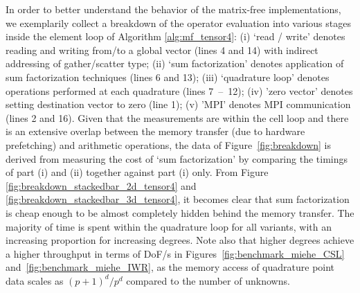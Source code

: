 \documentclass[AMA,STIX1COL]{WileyNJD-v2}
\begin{document}
In order to better understand the behavior of the matrix-free implementations,
we exemplarily collect a breakdown of the operator evaluation into various stages inside the element loop of Algorithm \ref{alg:mf_tensor4}:
(i) `read / write' denotes reading and writing from/to a global vector (lines 4 and 14) with indirect addressing of gather/scatter type;
(ii) `sum factorization' denotes application of sum factorization techniques (lines 6 and 13);
(iii) `quadrature loop' denotes operations performed at each quadrature (lines \mbox{7 -- 12});
(iv) 'zero vector' denotes setting destination vector to zero (line 1);
(v) 'MPI' denotes MPI communication (lines 2 and 16).
Given that the measurements are within the cell loop and there is an extensive overlap between the memory transfer (due to hardware prefetching) and arithmetic operations,
the data of Figure~\ref{fig:breakdown} is derived from measuring the cost of `sum factorization' by comparing the timings of
part (i) and (ii) together against part (i) only.
From Figure \ref{fig:breakdown_stackedbar_2d_tensor4} and  \ref{fig:breakdown_stackedbar_3d_tensor4}, it becomes clear that sum factorization is cheap enough
to be almost completely hidden behind the memory transfer.
The majority of time is spent within the quadrature loop for all variants, with an increasing proportion for increasing degrees.
Note also that higher degrees achieve a higher throughput in terms of DoF/s in Figures~\ref{fig:benchmark_miehe_CSL} and~\ref{fig:benchmark_miehe_IWR},
as the memory access of quadrature point data scales as $(p+1)^d/p^d$ compared to the number of unknowns.

\begin{table}
  \caption{Wall-clock time in seconds and performance in GFlops of Algorithms \ref{alg:mf_tensor2} and \ref{alg:mf_tensor4} in 2D for various combinations of polynomial degrees,
  vectorization and parallelization on Cascade Lake.}
  \label{tab:numbers_2d}
  \centering
\end{table}
\end{document}

